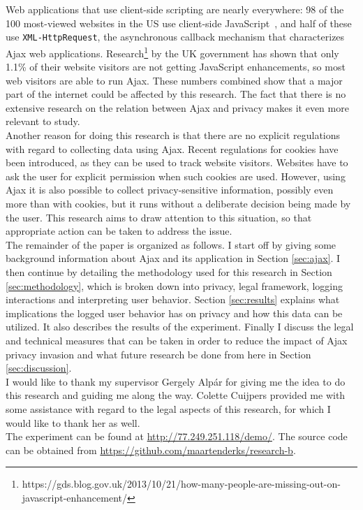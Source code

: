 Web applications that use client-side scripting are nearly everywhere: 98 of the 100 most-viewed websites in the US use client-side JavaScript~\cite{guha2009using}, and half of these use \verb|XML-HttpRequest|, the asynchronous callback mechanism that characterizes Ajax web applications. Research\footnote{https://gds.blog.gov.uk/2013/10/21/how-many-people-are-missing-out-on-javascript-enhancement/} by the UK government has shown that only 1.1\% of their website visitors are not getting JavaScript enhancements, so most web visitors are able to run Ajax. These numbers combined show that a major part of the internet could be affected by this research. The fact that there is no extensive research on the relation between Ajax and privacy makes it even more relevant to study.\\

Another reason for doing this research is that there are no explicit regulations with regard to collecting data using Ajax. Recent regulations for cookies have been introduced, as they can be used to track website visitors. Websites have to ask the user for explicit permission when such cookies are used. However, using Ajax it is also possible to collect privacy-sensitive information, possibly even more than with cookies, but it runs without a deliberate decision being made by the user. This research aims to draw attention to this situation, so that appropriate action can be taken to address the issue.\\
	
The remainder of the paper is organized as follows. I start off by giving some background information about Ajax and its application in Section \ref{sec:ajax}. I then continue by detailing the methodology used for this research in Section \ref{sec:methodology}, which is broken down into privacy, legal framework, logging interactions and interpreting user behavior. Section \ref{sec:results} explains what implications the logged user behavior has on privacy and how this data can be utilized. It also describes the results of the experiment. Finally I discuss the legal and technical measures that can be taken in order to reduce the impact of Ajax privacy invasion and what future research be done from here in Section \ref{sec:discussion}.\\

I would like to thank my supervisor Gergely Alp\'{a}r for giving me the idea to do this research and guiding me along the way. Colette Cuijpers provided me with some assistance with regard to the legal aspects of this research, for which I would like to thank her as well.\\

The experiment can be found at \url{http://77.249.251.118/demo/}. The source code can be obtained from \url{https://github.com/maartenderks/research-b}.